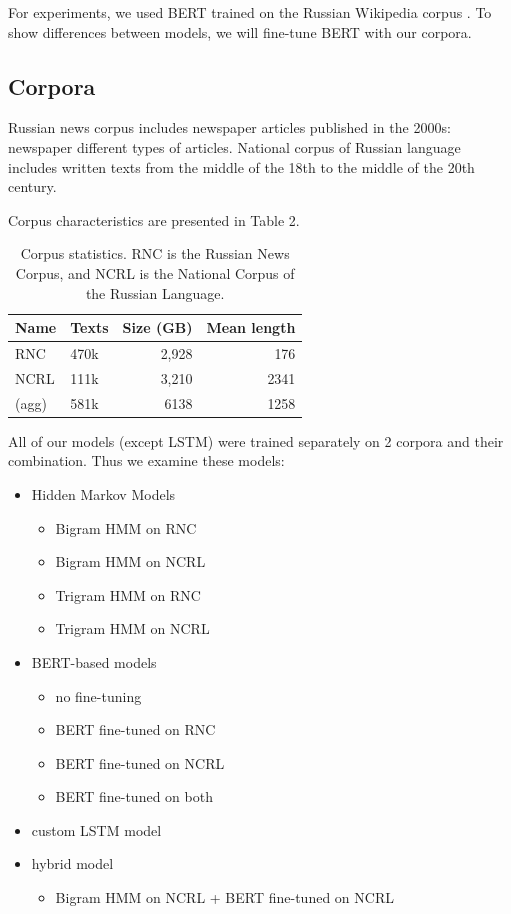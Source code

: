 \documentclass[a4paper]{article}
\begin{document}
For experiments, we used BERT trained on the Russian Wikipedia corpus
\cite{ruwiki}. To show differences between models, we will fine-tune BERT with our corpora.


\subsection{Corpora}

Russian news corpus \cite{runews} includes newspaper articles published in the 2000s: newspaper different types of articles.
National corpus of Russian language \cite{natcorp} includes written texts from the middle of the 18th to the middle of the 20th century.

Corpus characteristics are presented in Table 2.

\begin{table}
\caption{Corpus statistics. RNC is the Russian News Corpus, and NCRL is the National Corpus of the Russian Language.
\newline}
\centering

\begin{tabular}{llrr}
\textbf{Name}&
\textbf{Texts} &
\textbf{Size} (GB)&
\textbf{Mean length}\\
\hline
RNC &
470k&
2,928&
176\\
NCRL &
111k &
3,210 &
2341 \\
(agg) &
581k &
6138 &
1258
\end{tabular}
\end{table}


All of our models (except LSTM) were trained separately on 2 corpora and their combination. Thus we examine these models:

\begin{itemize}
	\item Hidden Markov Models
	\begin{itemize}
		\item Bigram HMM on RNC
		\item Bigram HMM on NCRL
		\item Trigram HMM on RNC
		\item Trigram HMM on NCRL
	\end{itemize}
	\item BERT-based models

	\begin{itemize}
		\item no fine-tuning
		\item BERT fine-tuned on RNC
		\item BERT fine-tuned on NCRL
		\item BERT fine-tuned on both
	\end{itemize}

	\item custom LSTM model
	\item hybrid model
	\begin{itemize}
		\item Bigram HMM on NCRL + BERT fine-tuned on NCRL
	\end{itemize}
\end{itemize}
\end{document}
